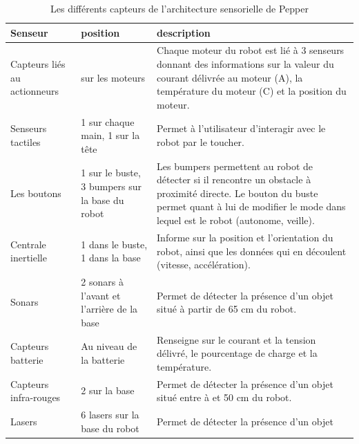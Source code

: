 \begin{table}[h]
	\begin{tabular}{ | p{3cm} | p{4cm} | p{7cm} | }
		\hline
		Senseur & position & description \\
		\hline
		Capteurs liés au actionneurs & sur les moteurs & Chaque moteur du robot est lié à 3 senseurs donnant des informations sur la valeur du courant délivrée au moteur (A), la température du moteur (C) et la position du moteur. \\
		\hline
		Senseurs tactiles & 1 sur chaque main, 1 sur la tête & Permet à l'utilisateur d'interagir avec le robot par le toucher.	\\	
		\hline 
		Les boutons & 1 sur le buste, 3 bumpers sur la base du robot & Les bumpers permettent au robot de détecter si il rencontre un obstacle à proximité directe. Le bouton du buste permet quant à lui de modifier le mode dans lequel est le robot (autonome, veille). \\
		\hline 
		Centrale inertielle & 1 dans le buste, 1 dans la base & Informe sur la position et l'orientation du robot, ainsi que les données qui en découlent (vitesse, accélération). \\
		\hline
		Sonars & 2 sonars à l'avant et l'arrière de la base & Permet de détecter la présence d'un objet situé à partir de 65 cm du robot. \\
		\hline 
		Capteurs batterie & Au niveau de la batterie & Renseigne sur le courant et la tension délivré, le pourcentage de charge et la température. \\
		\hline
		Capteurs infra-rouges & 2 sur la base &  Permet de détecter la présence d'un objet situé entre à et 50 cm du robot. \\
		\hline
		Lasers & 6 lasers sur la base du robot & Permet de détecter la présence d'un objet \\
		\hline 
	\end{tabular}
	\caption[Les différents capteurs de Pepper]{Les différents capteurs de l'architecture sensorielle de Pepper}
	\label {tab: Les différents capteurs de Pepper}
\end{table}


